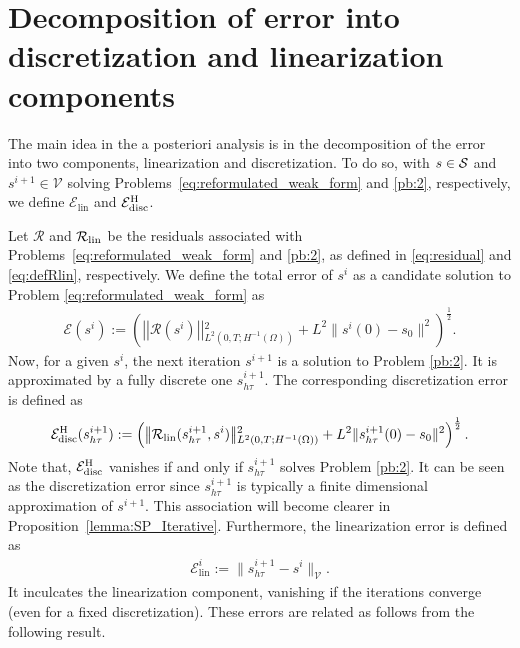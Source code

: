 \documentclass[review,11pt]{article}
\numberwithin{equation}{section}
\def \t  {\tau}
\def \calE {\mathcal{E}}
\def \calR {\mathcal{R}}
\begin{document}
\section{Decomposition of error into discretization and linearization components}\label{subsec:decomposition}
The main idea in the a posteriori analysis is in the decomposition of the error into two components, linearization and discretization. To do so, with $s \in \cal S$ and $s^{i+1} \in \mathcal{V}$ solving Problems~\ref{eq:reformulated_weak_form} and \ref{pb:2}, respectively, we define $\calE_{\mathrm{lin}}$ and $\calE_{\mathrm{disc}}^{\rm H}$. 

Let $\calR$  and $\calR_{\rm lin}$ be the residuals associated with Problems~\ref{eq:reformulated_weak_form} and \ref{pb:2}, as defined in \eqref{eq:residual} and \eqref{eq:defRlin}, respectively. We define the total error of $s^i$ as a candidate solution to Problem \ref{eq:reformulated_weak_form} as
\begin{align}\label{eq:total_indicator}
\mathcal{E}(s^i) 
:=\left(\left\vert\!\left\vert \mathcal{R}(s^i) \right\vert\!\right\vert\!_{L^2(0,T;H^{-1}(\Omega))} ^2 + L^2 \|s^{i}(0)-s_0\|^2\right)^{\frac{1}{2}}.
\end{align}
Now, for a given $s^i$, the next iteration $s^{i+1}$ is a solution to Problem \ref{pb:2}. It is approximated by a fully discrete one $s^{i+1}_{h\tau}$. The corresponding  discretization error is defined as
\begin{align}\label{eq:disc_error}
\calE_{\mathrm{disc}}^{\rm H}(s^{i+1}_{h\t})
:= \left(\left\vert\!\left\vert \mathcal{R}_{\mathrm{lin}}(s_{h\tau}^{i+1}, s^i) \right\vert\!\right\vert\!_{L^2(0,T;H^{-1}(\Omega))} ^2 + L^2 \|s^{i+1}_{h\t}(0)-s_0\|^2\right)^{\frac{1}{2}}.
\end{align}
Note that, $\calE_{\mathrm{disc}}^{\rm H}$  vanishes if and only if $s^{i+1}_{h\t}$ solves Problem \ref{pb:2}. It can be seen as the discretization error since $s^{i+1}_{h\t}$ is typically a finite dimensional approximation of $s^{i+1}$. This association will become clearer in Proposition~\ref{lemma:SP_Iterative}. Furthermore, the linearization error is defined as 
\begin{align}\label{err:linearization}
\calE_{\mathrm{lin}}^i 
:= \|s^{i+1}_{h\t}- s^i\|_\mathcal{V}.
\end{align}
It inculcates the linearization component, vanishing if the iterations converge (even for a fixed discretization). These errors are related as follows from the following result.
\end{document}
